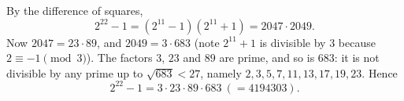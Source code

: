 By the difference of squares,
\[2^{22}-1=\left(2^{11}-1\right)\left(2^{11}+1\right)=2047\cdot2049 .\]
Now $2047=23\cdot89$, and $2049=3\cdot683$ (note $2^{11}+1$ is divisible by $3$ because $2\equiv-1\pmod3$). The factors $3$, $23$ and $89$ are prime, and so is $683$: it is not divisible by any prime up to $\sqrt{683}<27$, namely $2,3,5,7,11,13,17,19,23$. Hence
\[2^{22}-1=\boxed{3\cdot23\cdot89\cdot683}\ (=4194303).\]
